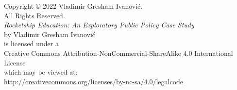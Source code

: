 
\begin{vplace}[1]
\footnotesize
    \begin{center}
        Copyright © 2022 Vladimir Gresham Ivanović.\\
        All Rights Reserved.\\\bigskip\bigskip
        \textit{Rocketship Education: An Exploratory Public Policy Case Study}\\
        by Vladimir Gresham Ivanović\\
        is licensed under a \\
        Creative Commons Attribution-NonCommercial-ShareAlike 4.0 International License\\
        which may be viewed at:\\
        \url{http://creativecommons.org/licenses/by-nc-sa/4.0/legalcode}
    \end{center}
 \end{vplace}
 
